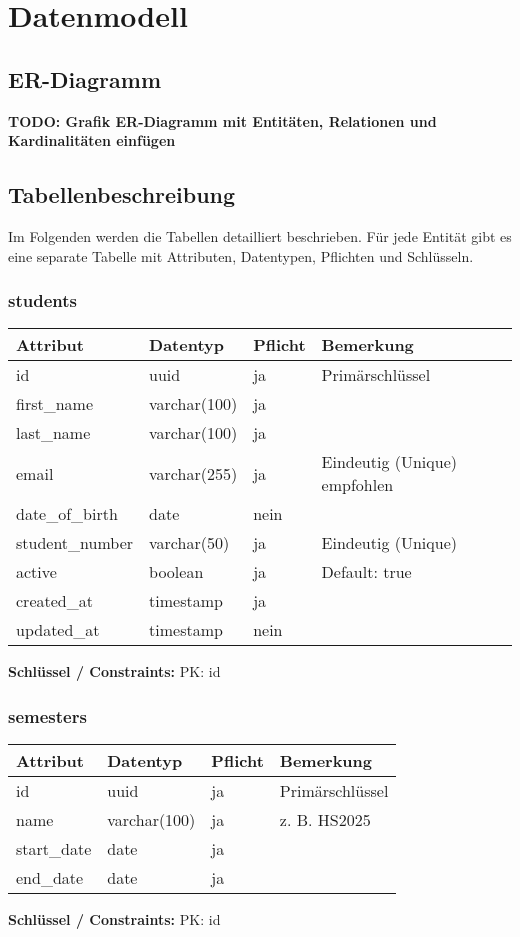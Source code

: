 \documentclass[12pt,a4paper]{article}
\begin{document}
    \section{Datenmodell}

    \subsection{ER-Diagramm}
    \textbf{TODO: Grafik ER-Diagramm mit Entitäten, Relationen und Kardinalitäten einfügen}

    \subsection{Tabellenbeschreibung}
    Im Folgenden werden die Tabellen detailliert beschrieben. Für jede Entität gibt es eine separate Tabelle mit Attributen, Datentypen, Pflichten und Schlüsseln.

    \subsubsection{students}
    \begin{longtable}{|p{4cm}|p{3cm}|p{3cm}|p{4cm}|}
        \hline
        \textbf{Attribut} & \textbf{Datentyp} & \textbf{Pflicht} & \textbf{Bemerkung} \\ \hline
        id & uuid & ja & Primärschlüssel \\ \hline
        first\_name & varchar(100) & ja &  \\ \hline
        last\_name & varchar(100) & ja &  \\ \hline
        email & varchar(255) & ja & Eindeutig (Unique) empfohlen \\ \hline
        date\_of\_birth & date & nein &  \\ \hline
        student\_number & varchar(50) & ja & Eindeutig (Unique) \\ \hline
        active & boolean & ja & Default: true \\ \hline
        created\_at & timestamp & ja &  \\ \hline
        updated\_at & timestamp & nein &  \\ \hline
    \end{longtable}
    \textbf{Schlüssel / Constraints:} PK: id

    \subsubsection{semesters}
    \begin{longtable}{|p{4cm}|p{3cm}|p{3cm}|p{4cm}|}
        \hline
        \textbf{Attribut} & \textbf{Datentyp} & \textbf{Pflicht} & \textbf{Bemerkung} \\ \hline
        id & uuid & ja & Primärschlüssel \\ \hline
        name & varchar(100) & ja & z. B. HS2025 \\ \hline
        start\_date & date & ja &  \\ \hline
        end\_date & date & ja &  \\ \hline
    \end{longtable}
    \textbf{Schlüssel / Constraints:} PK: id
\end{document}
